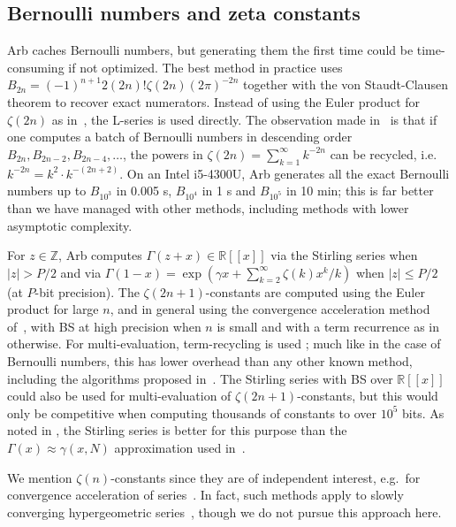 \documentclass[11pt]{article}
\begin{document}
\subsection{Bernoulli numbers and zeta constants}

Arb caches Bernoulli numbers, but generating them the first time
could be time-consuming if not optimized.
The best method in practice uses
$B_{2n} = (-1)^{n+1} 2(2n)! \zeta(2n) (2\pi)^{-2n}$
together with the von Staudt-Clausen theorem
to recover exact numerators.
Instead of using the Euler product for $\zeta(2n)$ as in~\cite{fillebrown1992faster},
the L-series is used directly.
The observation made in~\cite{bloemen}
is that if one computes a batch of Bernoulli numbers
in descending order $B_{2n}, B_{2n-2}, B_{2n-4}, \ldots$, the powers in
$\zeta(2n) = \sum_{k=1}^{\infty} k^{-2n}$
can be recycled, i.e.\ $k^{-2n} = k^2 \cdot k^{-(2n+2)}$.
On an Intel i5-4300U, Arb generates all the exact Bernoulli
numbers up to $B_{10^3}$ in 0.005 s,
$B_{10^4}$ in 1 s and $B_{10^5}$ in 10 min;
this is far better than
we have managed with other
methods, including methods with lower asymptotic complexity.

For $z \in \mathbb{Z}$, Arb computes $\Gamma(z+x) \in \mathbb{R}[[x]]$ via the Stirling series
when $|z| > P / 2$ and via
$\Gamma(1-x) = \exp\left(\gamma x + \sum_{k=2}^\infty \zeta(k) x^{k} / k \right)$
when $|z| \le P / 2$ (at $P$-bit precision).
The $\zeta(2n+1)$-constants are computed using the Euler product for large $n$,
and in general using the convergence acceleration method of~\cite{Borwein2000},
with BS at high precision when $n$ is small and with a term recurrence as in~\cite{mpfralg}
otherwise. For multi-evaluation, term-recycling is used \cite[Algorithm~4.7.1]{Johansson2014thesis};
much like in the case of Bernoulli numbers, this
has lower overhead than any other known method, including the algorithms proposed in~\cite{BorweinBradleyCrandall2000}.
The Stirling series with BS over $\mathbb{R}[[x]]$ could also be used
for multi-evaluation of $\zeta(2n+1)$-constants,
but this would only be competitive when computing thousands of constants
to over $10^5$ bits. As noted in \cite{Johansson2014thesis}, the Stirling series is better
for this purpose than
the $\Gamma(x) \approx \gamma(x,N)$ approximation
used in~\cite{Karatsuba1998,BorweinBradleyCrandall2000}.

We mention $\zeta(n)$-constants since they are of independent interest,
e.g.\ for convergence acceleration of series~\cite{flajolet1996zeta}.
In fact, such methods apply to slowly converging hypergeometric series~\cite{bogolubsky2006fast,skorokhodov2005method},
though we do not pursue this approach here.
\end{document}
